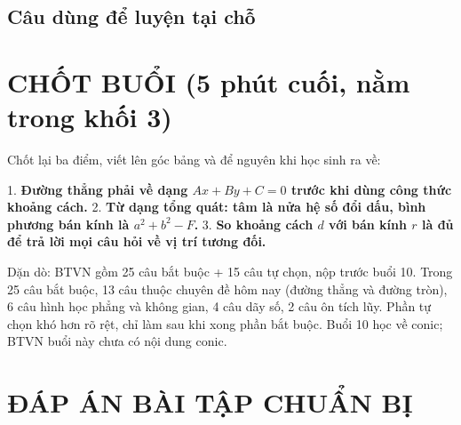 \documentclass[11pt, a4paper]{article}
\begin{document}
\subsection{Câu dùng để luyện tại chỗ}


\section{CHỐT BUỔI (5 phút cuối, nằm trong khối 3)}

Chốt lại ba điểm, viết lên góc bảng và để nguyên khi học sinh ra về:

1. \textbf{Đường thẳng phải về dạng $Ax + By + C = 0$ trước khi dùng công thức khoảng cách.}
2. \textbf{Từ dạng tổng quát: tâm là nửa hệ số đổi dấu, bình phương bán kính là $a^2 + b^2 - F$.}
3. \textbf{So khoảng cách $d$ với bán kính $r$ là đủ để trả lời mọi câu hỏi về vị trí tương đối.}

Dặn dò: BTVN gồm 25 câu bắt buộc + 15 câu tự chọn, nộp trước buổi 10. Trong 25 câu bắt buộc, 13 câu thuộc chuyên đề hôm nay (đường thẳng và đường tròn), 6 câu hình học phẳng và không gian, 4 câu dãy số, 2 câu ôn tích lũy. Phần tự chọn khó hơn rõ rệt, chỉ làm sau khi xong phần bắt buộc. Buổi 10 học về conic; BTVN buổi này chưa có nội dung conic.

\section{ĐÁP ÁN BÀI TẬP CHUẨN BỊ}
\end{document}
